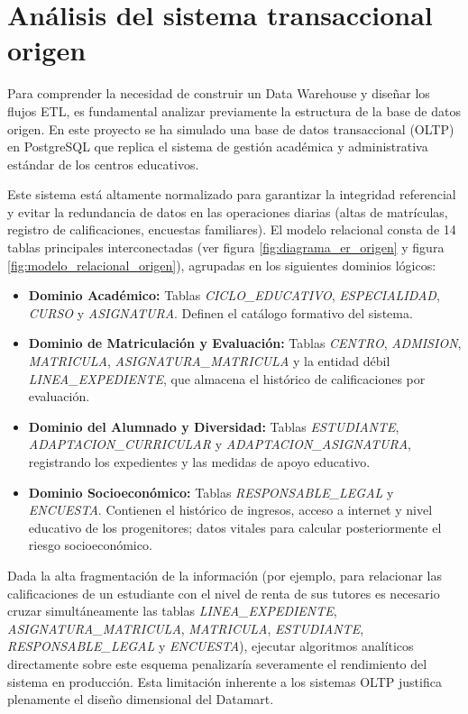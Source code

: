 \section{Análisis del sistema transaccional origen}

Para comprender la necesidad de construir un Data Warehouse y diseñar los flujos ETL, es fundamental analizar previamente la estructura de la base de datos origen. En este proyecto se ha simulado una base de datos transaccional (OLTP) en PostgreSQL que replica el sistema de gestión académica y administrativa estándar de los centros educativos.

Este sistema está altamente normalizado para garantizar la integridad referencial y evitar la redundancia de datos en las operaciones diarias (altas de matrículas, registro de calificaciones, encuestas familiares). El modelo relacional consta de 14 tablas principales interconectadas (ver figura \ref{fig:diagrama_er_origen} y figura \ref{fig:modelo_relacional_origen}), agrupadas en los siguientes dominios lógicos:

\begin{itemize}
    \item \textbf{Dominio Académico:} Tablas \textit{CICLO\-\_EDUCATIVO}, \textit{ESPECIALIDAD}, \textit{CURSO} y \textit{ASIGNATURA}. Definen el catálogo formativo del sistema.
    \item \textbf{Dominio de Matriculación y Evaluación:} Tablas \textit{CENTRO}, \textit{ADMISION}, \textit{MATRICULA}, \textit{ASIGNATURA\-\_MATRICULA} y la entidad débil \textit{LINEA\-\_EXPEDIENTE}, que almacena el histórico de calificaciones por evaluación.
    \item \textbf{Dominio del Alumnado y Diversidad:} Tablas \textit{ESTUDIANTE}, \textit{ADAPTACION\-\_CURRICULAR} y \textit{ADAPTACION\-\_ASIGNATURA}, registrando los expedientes y las medidas de apoyo educativo.
    \item \textbf{Dominio Socioeconómico:} Tablas \textit{RESPONSABLE\-\_LEGAL} y \textit{ENCUESTA}. Contienen el histórico de ingresos, acceso a internet y nivel educativo de los progenitores; datos vitales para calcular posteriormente el riesgo socioeconómico.
\end{itemize}

Dada la alta fragmentación de la información (por ejemplo, para relacionar las calificaciones de un estudiante con el nivel de renta de sus tutores es necesario cruzar simultáneamente las tablas \textit{LINEA\-\_EXPEDIENTE}, \textit{ASIGNATURA\-\_MATRICULA}, \textit{MATRICULA}, \textit{ESTUDIANTE}, \textit{RESPONSABLE\-\_LEGAL} y \textit{ENCUESTA}), ejecutar algoritmos analíticos directamente sobre este esquema penalizaría severamente el rendimiento del sistema en producción. Esta limitación inherente a los sistemas OLTP justifica plenamente el diseño dimensional del Datamart.

